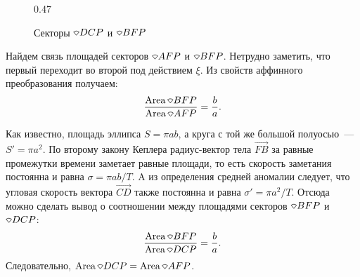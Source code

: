 \begin{figure}[h!]
\begin{subcaptionblock}{0.47\tw}
        \caption{Секторы $\sector DCP$ и $\sector BFP$}
        \label{pic:kepler-eq-BFP-DCP}
    \end{subcaptionblock}
    \caption{}
\end{figure}

Найдем связь площадей секторов $\sector AFP$ и $\sector BFP$. Нетрудно заметить, что первый переходит во второй под действием $\xi$. Из свойств аффинного преобразования получаем:
\begin{equation*}
    \frac{\area \sector BFP}{\area \sector AFP} = \frac{b}{a}.
\end{equation*}


Как известно, площадь эллипса $S = \pi ab$, а круга с той же большой полуосью~---  $S' = \pi a^2$. По второму закону Кеплера радиус-вектор тела $\overrightarrow{FB}$ за равные промежутки времени заметает равные площади, то есть скорость заметания постоянна и равна $\sigma = \pi a b / T$. A из определения средней аномалии следует, что угловая скорость вектора $\overrightarrow{CD}$ также постоянна и равна $\sigma' = \pi a^2 / T$. Отсюда можно сделать вывод о соотношении между площадями секторов $\sector BFP$ и $ \sector DCP$:
\begin{equation*}
    \frac{\area \sector BFP}{\area \sector DCP} = \frac{b}{a}.
\end{equation*}
Следовательно, $\area \sector DCP = \area \sector AFP$.

